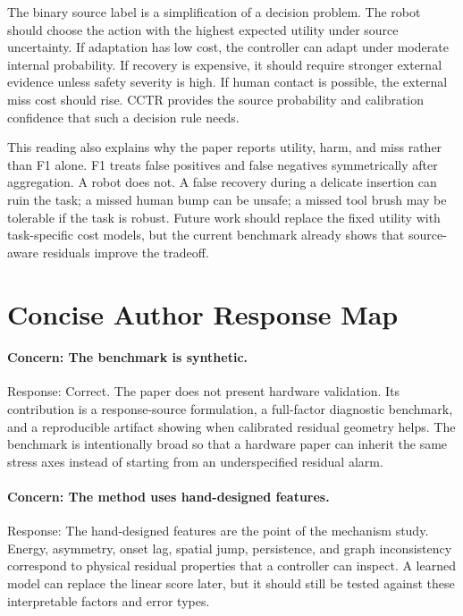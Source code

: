 \documentclass{article}
\newcommand{\method}{CCTR}
\begin{document}
The binary source label is a simplification of a decision problem. The robot should choose the action with the highest expected utility under source uncertainty. If adaptation has low cost, the controller can adapt under moderate internal probability. If recovery is expensive, it should require stronger external evidence unless safety severity is high. If human contact is possible, the external miss cost should rise. \method{} provides the source probability and calibration confidence that such a decision rule needs.

This reading also explains why the paper reports utility, harm, and miss rather than F1 alone. F1 treats false positives and false negatives symmetrically after aggregation. A robot does not. A false recovery during a delicate insertion can ruin the task; a missed human bump can be unsafe; a missed tool brush may be tolerable if the task is robust. Future work should replace the fixed utility with task-specific cost models, but the current benchmark already shows that source-aware residuals improve the tradeoff.

\section{Concise Author Response Map}

\paragraph{Concern: The benchmark is synthetic.}
Response: Correct. The paper does not present hardware validation. Its contribution is a response-source formulation, a full-factor diagnostic benchmark, and a reproducible artifact showing when calibrated residual geometry helps. The benchmark is intentionally broad so that a hardware paper can inherit the same stress axes instead of starting from an underspecified residual alarm.

\paragraph{Concern: The method uses hand-designed features.}
Response: The hand-designed features are the point of the mechanism study. Energy, asymmetry, onset lag, spatial jump, persistence, and graph inconsistency correspond to physical residual properties that a controller can inspect. A learned model can replace the linear score later, but it should still be tested against these interpretable factors and error types.
\end{document}

